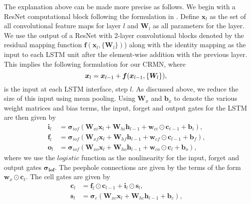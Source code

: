 \documentclass{article}
\begin{document}
The explanation above can be made more precise as follows. We begin with a ResNet computational block following the formulation in \cite{he2015deep}. Define $\boldsymbol{x}_l$ as the set of all convolutional feature maps for layer $l$ and $\boldsymbol{W}_l$ as all parameters for the layer. We use the output of a ResNet with 2-layer convolutional blocks denoted by the residual mapping function \(\boldsymbol{f}(\boldsymbol{x}_l, \{\boldsymbol{W}_l\})\)) along with the identity mapping as the input to each LSTM unit after the element-wise addition with the previous layer. This implies the following formulation for our CRMN, where
%
\begin{equation}
\boldsymbol{x}_l = \boldsymbol{x}_{l-1}+\boldsymbol{f}(\boldsymbol{x}_{l-1}, \{\boldsymbol{W}_l\}), \\
\end{equation} 
%
is the input at each LSTM interface, step $l$. As discussed above, we reduce the size of this input using mean pooling. Using  $\boldsymbol{W}_x$ and $\boldsymbol{b}_x$ to denote the various weight matrices and bias terms, the input, forget and output gates for the LSTM are then given by
%
\begin{align}
\boldsymbol{i}_l &= \boldsymbol{\sigma}_{iof}(\boldsymbol{W}_{xi} \boldsymbol{x}_l  + \boldsymbol{W}_{hi} \boldsymbol{h}_{l-1} + \boldsymbol{w}_{ci} \odot \boldsymbol{c}_{t-1} + \boldsymbol{b}_i), \\
\boldsymbol{f}_l &= \boldsymbol{\sigma}_{iof}(\boldsymbol{W}_{xf} \boldsymbol{x}_l + \boldsymbol{W}_{hf} \boldsymbol{h}_{l-1}
       + \boldsymbol{w}_{cf}  \odot \boldsymbol{c}_{l-1} + \boldsymbol{b}_f), \\
       \boldsymbol{o}_l &= \boldsymbol{\sigma}_{iof}(\boldsymbol{W}_{xo} \boldsymbol{x}_l + \boldsymbol{W}_{ho} \boldsymbol{h}_{l-1} + \boldsymbol{w}_{co} \odot \boldsymbol{c}_l + \boldsymbol{b}_o), 
\end{align}
%
where we use the \(logistic\) function as the nonlinearity for the input, forget and output gates \(\boldsymbol{\sigma_{iof}}\). %
The peephole connections are given by the terms of the form $\boldsymbol{w}_{x} \odot \boldsymbol{c}_t$. 
%
The cell gates are given by
%
%
\begin{align} 
\boldsymbol{c}_l &= \boldsymbol{f}_l  \odot \boldsymbol{c}_{l - 1}
       + \boldsymbol{i}_l \odot
       \boldsymbol{s}_l, \\
\boldsymbol{s}_l &=        \boldsymbol{\sigma}_c(\boldsymbol{W}_{xc} \boldsymbol{x}_l + \boldsymbol{W}_{hc} \boldsymbol{h}_{l-1} + \boldsymbol{b}_c), 
\end{align}
\end{document}
